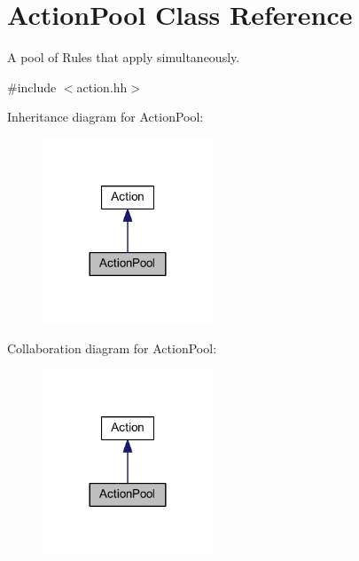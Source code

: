 \hypertarget{class_action_pool}{}\section{Action\+Pool Class Reference}
\label{class_action_pool}


A pool of Rules that apply simultaneously.  




{\ttfamily \#include $<$action.\+hh$>$}



Inheritance diagram for Action\+Pool\+:
\nopagebreak
\begin{figure}[H]
\begin{center}
\leavevmode
\includegraphics[width=144pt]{class_action_pool__inherit__graph}
\end{center}
\end{figure}


Collaboration diagram for Action\+Pool\+:
\nopagebreak
\begin{figure}[H]
\begin{center}
\leavevmode
\includegraphics[width=144pt]{class_action_pool__coll__graph}
\end{center}
\end{figure}
